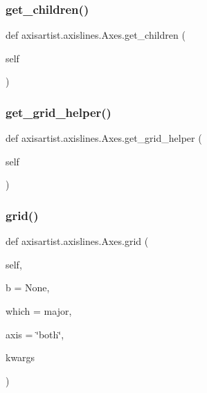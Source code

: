 \subsubsection{\texorpdfstring{get\+\_\+children()}{get\_children()}}
{\footnotesize\ttfamily def axisartist.\+axislines.\+Axes.\+get\+\_\+children (\begin{DoxyParamCaption}\item[{}]{self }\end{DoxyParamCaption})}

\mbox{\label{classaxisartist_1_1axislines_1_1Axes_ade0f38df95c0463a772d0d898ae94a27}} 
\subsubsection{\texorpdfstring{get\+\_\+grid\+\_\+helper()}{get\_grid\_helper()}}
{\footnotesize\ttfamily def axisartist.\+axislines.\+Axes.\+get\+\_\+grid\+\_\+helper (\begin{DoxyParamCaption}\item[{}]{self }\end{DoxyParamCaption})}

\mbox{\label{classaxisartist_1_1axislines_1_1Axes_a9687642a78eb668e48254ee32b84eda0}} 
\subsubsection{\texorpdfstring{grid()}{grid()}}
{\footnotesize\ttfamily def axisartist.\+axislines.\+Axes.\+grid (\begin{DoxyParamCaption}\item[{}]{self,  }\item[{}]{b = {\ttfamily None},  }\item[{}]{which = {\ttfamily \textquotesingle{}major\textquotesingle{}},  }\item[{}]{axis = {\ttfamily \char`\"{}both\char`\"{}},  }\item[{}]{kwargs }\end{DoxyParamCaption})}


